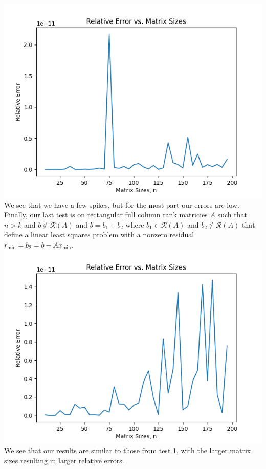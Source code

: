 \documentclass{article}
\begin{document}
\includegraphics[width=\linewidth]{Images/Figure_2.png}\newline
We see that we have a few spikes, but for the most part our errors are low.\newline\newline
Finally, our last test is on rectangular full column rank matricies $A$ such that $n>k$ and $b\notin\mathcal{R}(A)$ and 
$b=b_1+b_2$ where $b_1\in\mathcal{R}(A)$ and $b_2\notin\mathcal{R}(A)$ that define a linear least squares
problem with a nonzero residual $r_\min = b_2 = b-Ax_\min$.\newline
\includegraphics[width=\linewidth]{Images/Figure_3.png}\newline
We see that our results are similar to those from test 1, with the larger matrix sizes resulting in larger relative errors.
\end{document}
